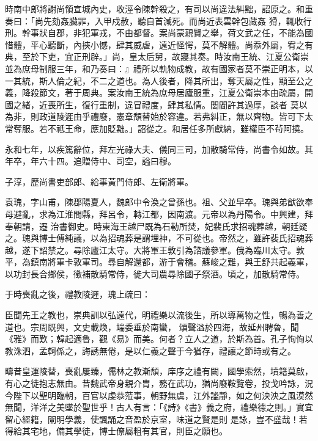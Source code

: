 \begin{pinyinscope}
 時南中郎將謝尚領宣城內史，收涇令陳幹殺之，有司以尚違法糾黜，詔原之。和重奏曰：「尚先劾姦臟罪，入甲戍赦，聽自首減死。而尚近表雲幹包藏姦
 猾，輒收行刑。幹事狀自郡，非犯軍戎，不由都督。案尚蒙親賢之舉，荷文武之任，不能為國惜體，平心聽斷，內挾小憾，肆其威虐，遠近怪愕，莫不解體。尚忝外屬，宥之有典，至於下吏，宜正刑辟。」尚，皇太后舅，故寢其奏。時汝南王統、江夏公衛崇並為庶母制服三年，和乃奏曰：』禮所以軌物成教，故有國家者莫不崇正明本，以一其統，斯人倫之紀，不二之道也。為人後者，降其所出，奪天屬之性，顯至公之義，降殺節文，著于周典。案汝南王統為庶母居廬服重，江夏公衛崇本由疏屬，開國之緒，近喪所生，復行重制，違冒禮度，肆其私情。閭閻許其過厚，談者
 莫以為非，則政道陵遲由乎禮廢，憲章頹替始於容違。若弗糾正，無以齊物。皆可下太常奪服。若不祗王命，應加貶黜。」詔從之。和居任多所獻納，雖權臣不茍阿撓。



 永和七年，以疾篤辭位，拜左光祿大夫、儀同三司，加散騎常侍，尚書令如故。其年卒，年六十四。追贈侍中、司空，謚曰穆。



 子淳，歷尚書吏部郎、給事黃門侍郎、左衛將軍。



 袁瑰，字山甫，陳郡陽夏人，魏郎中令渙之曾孫也。祖、父並早卒。瑰與弟猷欲奉母避亂，求為江淮間縣，拜呂令，轉江都，因南渡。元帝以為丹陽令。中興建，拜奉朝請，遷
 治書御史。時東海王越尸既為石勒所焚，妃裴氏求招魂葬越，朝廷疑之。瑰與博士傅純議，以為招魂葬是謂埋神，不可從也。帝然之，雖許裴氏招魂葬越，遂下詔禁之。尋除廬江太守。大將軍王敦引為諮議參軍。俄為臨川太守。敦平，為鎮南將軍卡敦軍司。尋自解還都，游于會稽。蘇峻之難，與王舒共起義軍，以功封長合鄉侯，徵補散騎常侍，徙大司農尋除國子祭酒。頃之，加散騎常侍。



 于時喪亂之後，禮教陵遲，瑰上疏曰：



 臣聞先王之教也，崇典訓以弘遠代，明禮樂以流後生，所以導萬物之性，暢為善之道也。宗周既興，文史載煥，端委垂於南蠻，
 頌聲溢於四海，故延州聘魯，聞《雅》而歎；韓起適魯，觀《易》而美。何者？立人之道，於斯為首。孔子恂恂以教洙泗，孟軻係之，誨誘無倦，是以仁義之聲于今猶存，禮讓之節時或有之。



 疇昔皇運陵替，喪亂屢臻，儒林之教漸頹，庠序之禮有闕，國學索然，墳籍莫啟，有心之徒抱志無由。昔魏武帝身親介胄，務在武功，猶尚廢鞍覽卷，投戈吟詠，況今陛下以聖明臨朝，百官以虔恭蒞事，朝野無虞，江外謐靜，如之何泱泱之風漠然無聞，洋洋之美墜於聖世乎！古人有言：「《詩》《書》義之府，禮樂德之則。」實宜留心經籍，闡明學義，使諷誦之音盈於京室，味道之賢是則
 是詠，豈不盛哉！若得給其宅地，備其學徒，博士僚屬粗有其官，則臣之願也。




\end{pinyinscope}
